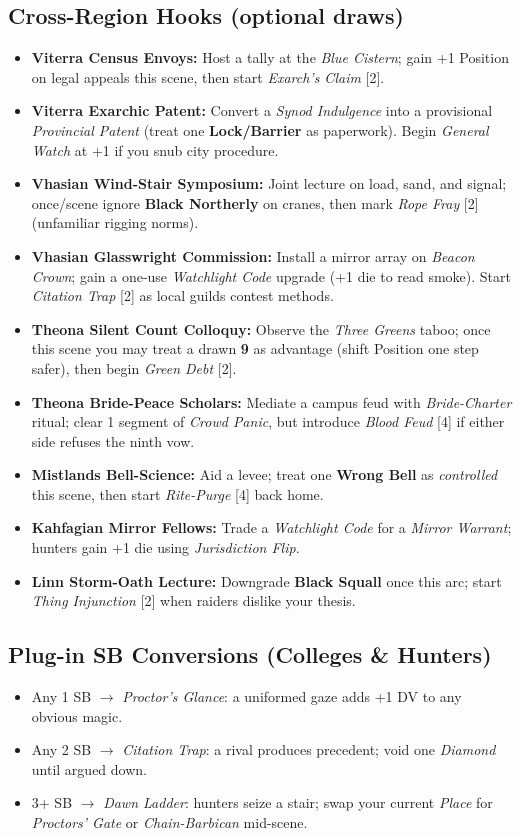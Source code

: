 \subsection*{Cross-Region Hooks (optional draws)}
\begin{itemize}
  \item \textbf{Viterra Census Envoys:} Host a tally at the \emph{Blue Cistern}; gain +1 Position on legal appeals this scene, then start \emph{Exarch’s Claim} [2].
  \item \textbf{Viterra Exarchic Patent:} Convert a \emph{Synod Indulgence} into a provisional \emph{Provincial Patent} (treat one \textbf{Lock/Barrier} as paperwork). Begin \emph{General Watch} at +1 if you snub city procedure.
  \item \textbf{Vhasian Wind-Stair Symposium:} Joint lecture on load, sand, and signal; once/scene ignore \textbf{Black Northerly} on cranes, then mark \emph{Rope Fray} [2] (unfamiliar rigging norms).
  \item \textbf{Vhasian Glasswright Commission:} Install a mirror array on \emph{Beacon Crown}; gain a one-use \emph{Watchlight Code} upgrade (+1 die to read smoke). Start \emph{Citation Trap} [2] as local guilds contest methods.
  \item \textbf{Theona Silent Count Colloquy:} Observe the \emph{Three Greens} taboo; once this scene you may treat a drawn \textbf{9} as advantage (shift Position one step safer), then begin \emph{Green Debt} [2].
  \item \textbf{Theona Bride-Peace Scholars:} Mediate a campus feud with \emph{Bride-Charter} ritual; clear 1 segment of \emph{Crowd Panic}, but introduce \emph{Blood Feud} [4] if either side refuses the ninth vow.
  \item \textbf{Mistlands Bell-Science:} Aid a levee; treat one \textbf{Wrong Bell} as \emph{controlled} this scene, then start \emph{Rite-Purge} [4] back home.
  \item \textbf{Kahfagian Mirror Fellows:} Trade a \emph{Watchlight Code} for a \emph{Mirror Warrant}; hunters gain +1 die using \emph{Jurisdiction Flip}.
  \item \textbf{Linn Storm-Oath Lecture:} Downgrade \textbf{Black Squall} once this arc; start \emph{Thing Injunction} [2] when raiders dislike your thesis.
\end{itemize}

\subsection*{Plug-in SB Conversions (Colleges \& Hunters)}
\begin{itemize}
  \item Any 1 SB $\rightarrow$ \emph{Proctor’s Glance}: a uniformed gaze adds +1 DV to any obvious magic.
  \item Any 2 SB $\rightarrow$ \emph{Citation Trap}: a rival produces precedent; void one \emph{Diamond} until argued down.
  \item 3+ SB $\rightarrow$ \emph{Dawn Ladder}: hunters seize a stair; swap your current \emph{Place} for \emph{Proctors’ Gate} or \emph{Chain-Barbican} mid-scene.
\end{itemize}

